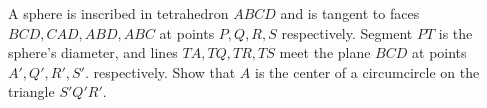 A sphere is inscribed in tetrahedron $ ABCD$ and is tangent to faces  $ BCD,CAD,ABD,ABC$ at points $ P,Q,R,S$ respectively. Segment $ PT$  is the sphere's diameter, and lines $ TA,TQ,TR,TS$ meet the plane $ BCD$ at points $ A',Q',R',S'$. respectively. Show that $ A$  is the center of a circumcircle on the triangle $ S'Q'R'$.
